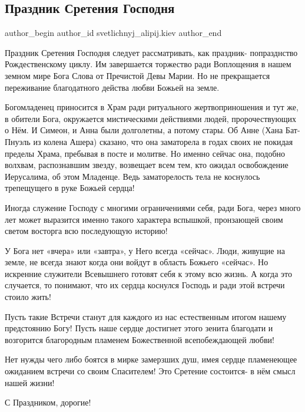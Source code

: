  
 
 
 
 
 
\subsection{Праздник Сретения Господня}
\label{sec:14_02_2022.fb.svetlichnyj_alipij.kiev.1.prazdnik_sretenia_gospodnja}
 
\ifcmt
 author_begin
   author_id svetlichnyj_alipij.kiev
 author_end
\fi

Праздник Сретения Господня следует рассматривать, как праздник- попразднство
Рождественскому циклу. Им завершается торжество ради  Воплощения в нашем земном
мире Бога Слова от Пречистой Девы Марии. Но не прекращается переживание
благодатного действа любви Божьей на земле.


Богомладенец приносится в Храм ради ритуального жертвоприношения и тут же, в
обители Бога, окружается мистическими действиями людей, пророчествующих о Нём.
И Симеон, и Анна были долголетны, а потому стары. Об Анне (Хана Бат- Пнуэль из
колена Ашера) сказано, что она заматорела в годах своих не покидая пределы
Храма, пребывая в посте и молитве. Но именно сейчас она, подобно волхвам,
распознавшим звезду, возвещает  всем тем, кто ожидал освобождение Иерусалима,
об этом Младенце. Ведь заматорелость тела не коснулось трепещущего в руке
Божьей сердца!

Иногда служение Господу с многими ограничениями себя, ради Бога, через много
лет может выразится именно такого характера вспышкой, пронзающей своим светом
восторга всю последующую историю! 

У Бога нет «вчера» или «завтра», у Него всегда «сейчас». Люди, живущие на
земле, не всегда знают когда они войдут в область Божьего «сейчас». Но
искренние служители Всевышнего  готовят себя к этому всю жизнь. А когда это
случается, то понимают, что их сердца коснулся Господь и ради этой встречи
стоило жить!

Пусть такие Встречи станут для каждого из нас естественным итогом нашему
предстоянию Богу! Пусть наше сердце достигнет этого зенита благодати и
возгорится благородным пламенем Божественной всепобеждающей любви!

Нет нужды чего либо боятся в мирке замерзших душ, имея сердце пламенеющее
ожиданием встречи со своим Спасителем! Это Сретение состоится- в нём смысл
нашей жизни!

С Праздником, дорогие!

